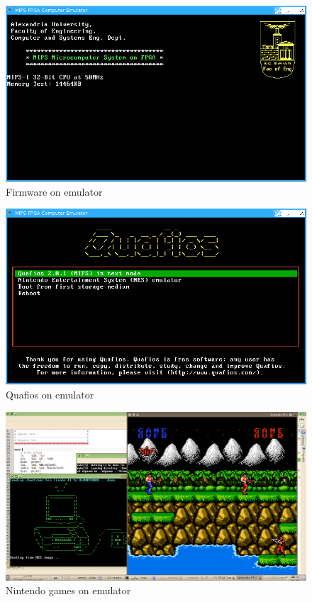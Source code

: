 \documentclass[oneside]{book}
\begin{document}
\begin{figure}
\begin{center}
\includegraphics[width=20cm]{res_emu1.png}
\end{center}
\caption{Firmware on emulator}
\end{figure}

\begin{figure}
\begin{center}
\includegraphics[width=20cm]{res_emu2.png}
\end{center}
\caption{Quafios on emulator}
\end{figure}

\begin{figure}
\begin{center}
\includegraphics[width=20cm]{res_nessim.png}
\end{center}
\caption{Nintendo games on emulator}
\end{figure}
\end{document}
